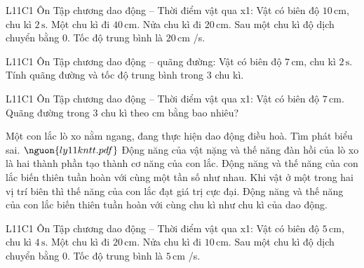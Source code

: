 \begin{ex}
L11C1 Ôn Tập chương dao động – Thời điểm vật qua x1: Vật có biên độ $10\,\text{cm}$, chu kì $2\,\text{s}$.
\choiceTF
{\True Một chu kì đi $40\,\text{cm}$.}
{\True Nửa chu kì đi $20\,\text{cm}$.}
{\True Sau một chu kì độ dịch chuyển bằng 0.}
{\True Tốc độ trung bình là $20\,\text{cm}$ /s.}
\end{ex}

\begin{ex}
L11C1 Ôn Tập chương dao động – quãng đường: Vật có biên độ $7\,\text{cm}$, chu kì $2\,\text{s}$. Tính quãng đường và tốc độ trung bình trong 3 chu kì.
\choiceTF

\end{ex}

\begin{ex}
L11C1 Ôn Tập chương dao động – Thời điểm vật qua x1: Vật có biên độ $7\,\text{cm}$. Quãng đường trong 3 chu kì theo cm bằng bao nhiêu?
\end{ex}

\begin{ex}
Một con lắc lò xo nằm ngang, đang thực hiện dao động điều hoà. Tìm phát biểu sai. $\nguon{ly11 kntt.pdf}$
\choice
{Động năng của vật nặng và thế năng đàn hồi của lò xo là hai thành phần tạo thành cơ năng của con lắc.}
{Động năng và thế năng của con lắc biến thiên tuần hoàn với cùng một tần số như nhau.}
{Khi vật ở một trong hai vị trí biên thì thế năng của con lắc đạt giá trị cực đại.}
{\True Động năng và thế năng của con lắc biến thiên tuần hoàn với cùng chu kì như chu kì của dao động.}
\end{ex}

\begin{ex}
L11C1 Ôn Tập chương dao động – Thời điểm vật qua x1: Vật có biên độ $5\,\text{cm}$, chu kì $4\,\text{s}$.
\choiceTF
{\True Một chu kì đi $20\,\text{cm}$.}
{\True Nửa chu kì đi $10\,\text{cm}$.}
{\True Sau một chu kì độ dịch chuyển bằng 0.}
{\True Tốc độ trung bình là $5\,\text{cm}$ /s.}
\end{ex}

